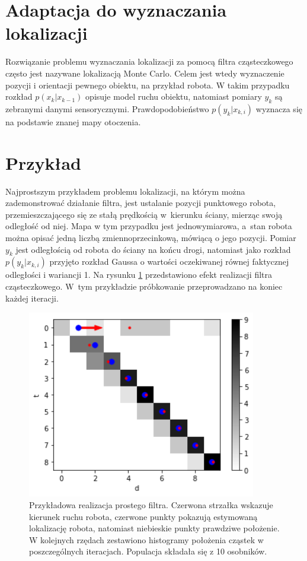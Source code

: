\section{Adaptacja do wyznaczania lokalizacji}
Rozwiązanie problemu wyznaczania lokalizacji za pomocą filtra cząsteczkowego często jest nazywane lokalizacją Monte Carlo. Celem jest wtedy wyznaczenie pozycji i orientacji pewnego obiektu, na przykład robota. W takim przypadku rozkład $p(x_k|x_{k-1})$ opisuje model ruchu obiektu, natomiast pomiary $y_k$ są zebranymi danymi sensorycznymi. Prawdopodobieństwo $p(y_k|x_{k,i})$ wyznacza się na podstawie znanej mapy otoczenia.

\section{Przykład}\label{simple_example_chap}
Najprostszym przykładem problemu lokalizacji, na którym można zademonstrować działanie filtra, jest ustalanie pozycji punktowego robota, przemieszczającego się ze stałą prędkością w~kierunku ściany, mierząc swoją odległość od niej. Mapa w tym przypadku jest jednowymiarowa, a~stan robota można opisać jedną liczbą zmiennoprzecinkową, mówiącą o jego pozycji. Pomiar $y_k$ jest odległością od robota do ściany na końcu drogi, natomiast jako rozkład $p(y_k|x_{k,i})$ przyjęto rozkład Gaussa o wartości oczekiwanej równej faktycznej odległości i wariancji 1. Na rysunku \ref{simple_example} przedstawiono efekt realizacji filtra cząsteczkowego. W~tym przykładzie próbkowanie przeprowadzano na koniec każdej iteracji.

\begin{figure}[H]
	\begin{center}
		\includegraphics[width=10cm]{./simple_example.png}
		\caption[Przykładowa realizacja prostego filtra.]{Przykładowa realizacja prostego filtra. Czerwona strzałka wskazuje kierunek ruchu robota, czerwone punkty pokazują estymowaną lokalizację robota, natomiast niebieskie punkty prawdziwe położenie. W kolejnych rzędach zestawiono histogramy położenia cząstek w poszczególnych iteracjach. Populacja składała się z 10 osobników.}\label{simple_example}
	\end{center}
\end{figure}

